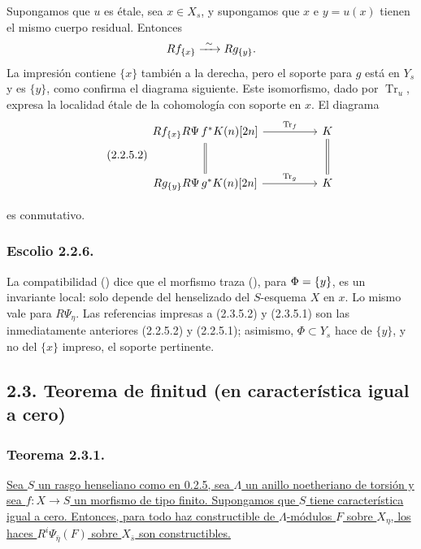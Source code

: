 Supongamos que $u$ es étale, sea $x\in X_s$, y supongamos que $x$ e
$y=u(x)$ tienen el mismo cuerpo residual. Entonces
\[
Rf_{\{x\}}\xrightarrow{\ \sim\ }Rg_{\{\sisi{x}{y}\}}.
\]
La impresión contiene $\{x\}$ también a la derecha, pero el soporte para $g$
está en $Y_s$ y es $\{y\}$, como confirma el diagrama siguiente. Este
isomorfismo, dado por $\operatorname{Tr}_u$, expresa la localidad étale de la
cohomología con soporte en $x$. El diagrama
\begin{equation}\tag{2.2.5.2}
\begin{tikzcd}[column sep=huge, row sep=large]
Rf_{\{x\}}R\Psi\,f^*K(n)[2n]
  \arrow[r, "\operatorname{Tr}_f"] \arrow[d, equal]
  & K \arrow[d, equal] \\
Rg_{\{y\}}R\Psi\,g^*K(n)[2n]
  \arrow[r, "\operatorname{Tr}_g"]
  & K
\end{tikzcd}
\end{equation}

\pageoriginale

es conmutativo.

\subsubsection*{Escolio 2.2.6.}
La compatibilidad () dice que el morfismo traza
(), para $\Phi=\{\sisi{x}{y}\}$, es un invariante
local: solo depende del henselizado del $S$-esquema $X$ en $x$. Lo mismo vale
para $R\Psi_\eta$. Las referencias impresas a (2.3.5.2) y (2.3.5.1) son las
inmediatamente anteriores (2.2.5.2) y (2.2.5.1); asimismo,
$\Phi\subset Y_s$ hace de $\{y\}$, y no del $\{x\}$ impreso, el soporte
pertinente.

\subsection*{2.3. Teorema de finitud (en característica igual a cero)}

\subsubsection*{Teorema 2.3.1.}
\underline{Sea $S$ un rasgo henseliano como en 0.2.5, sea $\Lambda$ un anillo
noetheriano de torsión y sea $f:X\longrightarrow S$ un morfismo de tipo
finito. Supongamos que $S$ tiene característica igual a cero. Entonces, para
todo haz constructible de $\Lambda$-módulos $F$ sobre $X_\eta$, los haces
$R^i\Psi_{\bar\eta}(F)$ sobre $X_{\bar s}$ son constructibles.}


